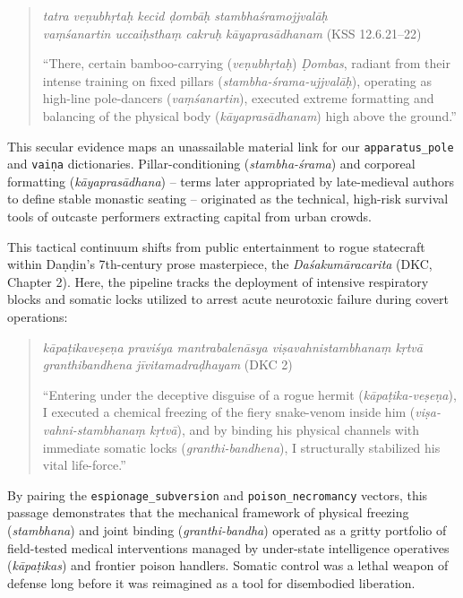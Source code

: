 \documentclass[11pt,twoside,letterpaper]{article}
\begin{document}
\begin{quote}
\small
\textit{tatra veṇubhṛtaḥ kecid ḍombāḥ stambhaśramojjvalāḥ \\
vaṃśanartin uccaiḥsthaṃ cakruḥ kāyaprasādhanam} (KSS 12.6.21–22)
\medskip

``There, certain bamboo-carrying (\textit{veṇubhṛtaḥ}) \textit{Ḍombas}, radiant from their intense training on fixed pillars (\textit{stambha-śrama-ujjvalāḥ}), operating as high-line pole-dancers (\textit{vaṃśanartin}), executed extreme formatting and balancing of the physical body (\textit{kāyaprasādhanam}) high above the ground.''
\end{quote}

This secular evidence maps an unassailable material link for our \texttt{apparatus\_pole} and \texttt{vaiṇa} dictionaries. Pillar-conditioning (\textit{stambha-śrama}) and corporeal formatting (\textit{kāyaprasādhana}) -- terms later appropriated by late-medieval authors to define stable monastic seating -- originated as the technical, high-risk survival tools of outcaste performers extracting capital from urban crowds.

This tactical continuum shifts from public entertainment to rogue statecraft within Daṇḍin's 7th-century prose masterpiece, the \textit{Daśakumāracarita} (DKC, Chapter 2). Here, the pipeline tracks the deployment of intensive respiratory blocks and somatic locks utilized to arrest acute neurotoxic failure during covert operations:

\begin{quote}
\small
\textit{kāpaṭikaveṣeṇa praviśya mantrabalenāsya viṣavahnistambhanaṃ kṛtvā granthibandhena jīvitamadraḍhayam} (DKC 2)
\medskip

``Entering under the deceptive disguise of a rogue hermit (\textit{kāpaṭika-veṣeṇa}), I executed a chemical freezing of the fiery snake-venom inside him (\textit{viṣa-vahni-stambhanaṃ kṛtvā}), and by binding his physical channels with immediate somatic locks (\textit{granthi-bandhena}), I structurally stabilized his vital life-force.''
\end{quote}

By pairing the \texttt{espionage\_subversion} and \texttt{poison\_necromancy} vectors, this passage demonstrates that the mechanical framework of physical freezing (\textit{stambhana}) and joint binding (\textit{granthi-bandha}) operated as a gritty portfolio of field-tested medical interventions managed by under-state intelligence operatives (\textit{kāpaṭikas}) and frontier poison handlers. Somatic control was a lethal weapon of defense long before it was reimagined as a tool for disembodied liberation.
\end{document}
